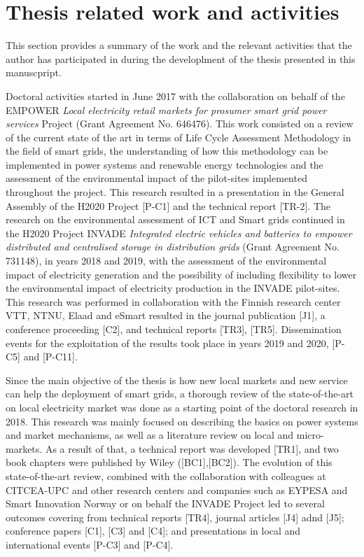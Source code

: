 \newpage 
\section{Thesis related work and activities}
This section provides a summary of the work and the relevant activities that the author has participated in during the developlment of the thesis presented in this manuscpript. 
 	
Doctoral activities started in June 2017 with the collaboration on behalf of the EMPOWER \textit{Local electricity retail markets for prosumer smart grid power services } Project (Grant Agreement No. 646476). This work consisted on a review of the current state of the art in terms of Life Cycle Assessment Methodology in the field of smart grids, the understanding of how this methodology can be implemented in power systems and renewable energy technologies and the assessment of the environmental impact of the pilot-sites implemented throughout the project. This research resulted in a presentation in the General Assembly of the H2020 Project [P-C1] and the technical report [TR-2]. The research on the environmental assessment of ICT and Smart grids continued in the H2020 Project INVADE \textit{Integrated electric vehicles and batteries to empower distributed and centralised storage in distribution grids} (Grant Agreement No. 731148), in years  2018 and 2019, with the assessment of the environmental impact of electricity generation and the possibility of including flexibility to lower the environmental impact of electricity production in the INVADE pilot-sites. This research was performed in collaboration with the Finnish research center VTT, NTNU, Elaad and eSmart resulted in the journal publication [J1], a conference proceeding [C2], and technical reports [TR3], [TR5]. Dissemination events for the exploitation of the results took place in years 2019 and 2020, [P-C5] and [P-C11]. 

Since the main objective of the thesis is how new local markets and new service can help the deployment of smart grids, a thorough review of the state-of-the-art on local electricity market was done as a starting point of the doctoral research in 2018. This research was mainly focused on describing the basics on power systems and market mechanisms, as well as a literature review on local and micro-markets. As a result of that, a technical report was developed [TR1], and two book chapters were published by Wiley ([BC1],[BC2]).  The evolution of this state-of-the-art review, combined with the collaboration with colleagues at CITCEA-UPC and other research centers and companies such as EYPESA and Smart Innovation Norway or on behalf the INVADE Project led to several outcomes covering from technical reports [TR4], journal articles [J4] adnd [J5]; conference papers [C1], [C3] and [C4]; and presentations in local and international events [P-C3] and [P-C4].  


